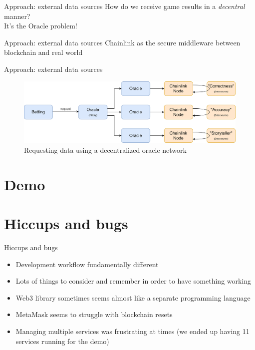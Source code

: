 \documentclass[aspectratio=169]{beamer}
\begin{document}
  \begin{frame}{Approach: external data sources}
    How do we receive game results in a \emph{decentral} manner?\pause\\
    It's the Oracle problem!
  \end{frame}

  \begin{frame}{Approach: external data sources}
    \centering\alert{Chainlink} as the secure middleware between blockchain and real world
  \end{frame}

  \begin{frame}{Approach: external data sources}
    \begin{figure}[htbp]
      \centering
      \includegraphics[scale=0.08]{img/oracle}
      \caption{Requesting data using a decentralized oracle network}
    \end{figure}
  \end{frame}

  \section{Demo}

  \section{Hiccups and bugs}
  \begin{frame}{Hiccups and bugs}
    \begin{itemize}
      \item Development workflow fundamentally different
      \item Lots of things to consider and remember in order to have something working
      \item Web3 library sometimes seems almost like a separate programming language
      \item MetaMask seems to struggle with blockchain resets
      \item Managing multiple services was frustrating at times (we ended up having 11 services running for the demo)
    \end{itemize}
  \end{frame}
\end{document}

